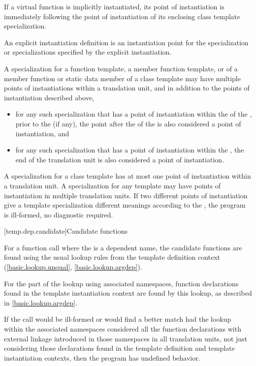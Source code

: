 \pnum
If a virtual function is implicitly instantiated, its point of instantiation
is immediately following the point of instantiation of its enclosing class
template specialization.

\pnum
An explicit instantiation definition is an instantiation
point for the specialization or specializations specified by the explicit
instantiation.

\pnum
A specialization for a function template, a member function template,
or of a member function or static data member of a class template may have
multiple points of instantiations within a translation unit, and in addition
to the points of instantiation described above,
\begin{itemize}
\item
for any such
specialization that has a point of instantiation within the
 of the
,
prior to the  (if any),
the point after the 
of the 
is also considered a point of instantiation,
and
\item
for any such specialization that has a point of instantiation
within the ,
the end of the translation unit is also
considered a point of instantiation.
\end{itemize}
A specialization for a class template has at most one point of instantiation
within a translation unit.
A specialization for any template may have points of instantiation in multiple
translation units.
If two different points of instantiation give a template specialization
different meanings according to the ,
the program is ill-formed, no diagnostic required.

[temp.dep.candidate]{Candidate functions}

\pnum
{}%
For a function call where the  is a
dependent name,
the candidate functions are found using the usual lookup
rules from the template definition context
(\ref{basic.lookup.unqual}, \ref{basic.lookup.argdep}).
\begin{note}
For the part of the lookup using associated namespaces,
function declarations found in the template instantiation context
are found by this lookup, as described in \ref{basic.lookup.argdep}.
\end{note}
If
the call would be ill-formed or would find a better match had the lookup
within the associated namespaces considered all the function declarations with
external linkage introduced in those namespaces in all translation units,
not just considering those declarations found in the template definition and
template instantiation contexts, then the program has undefined behavior.

